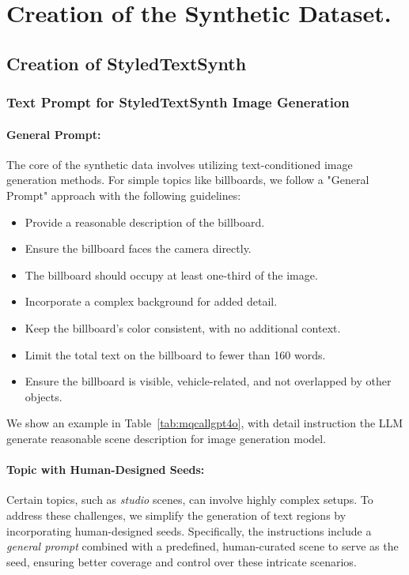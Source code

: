 
\newpage
\appendix
\onecolumn
\section{Creation of the Synthetic Dataset.}

\subsection{Creation of StyledTextSynth}
\label{sec:appendix_create_mq}

\subsubsection{Text Prompt for StyledTextSynth Image Generation}
\paragraph{General Prompt:}
The core of the synthetic data involves utilizing text-conditioned image generation methods. 
For simple topics like billboards, we follow a "General Prompt" approach with the following guidelines:
\begin{itemize}
    \item Provide a reasonable description of the billboard.
    \item Ensure the billboard faces the camera directly.
    \item The billboard should occupy at least one-third of the image.
    \item Incorporate a complex background for added detail.
    \item Keep the billboard's color consistent, with no additional context.
    \item Limit the total text on the billboard to fewer than 160 words.
    \item Ensure the billboard is visible, vehicle-related, and not overlapped by other objects.
\end{itemize}

We show an example in Table~\ref{tab:mqcallgpt4o}, with detail instruction the LLM generate reasonable scene description for image generation model.





\paragraph{Topic with Human-Designed Seeds:}
Certain topics, such as \textit{studio} scenes, can involve highly complex setups. 
To address these challenges, we simplify the generation of text regions by incorporating human-designed seeds. 
Specifically, the instructions include a \textit{general prompt} combined with a predefined, human-curated scene to serve as the seed, ensuring better coverage and control over these intricate scenarios.

